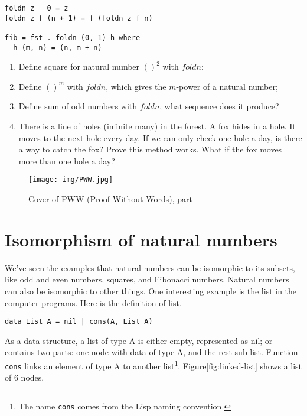 \documentclass[UTF8]{article}
\begin{document}
\lstset{frame=single}
\begin{lstlisting}
foldn z _ 0 = z
foldn z f (n + 1) = f (foldn z f n)

fib = fst . foldn (0, 1) h where
  h (m, n) = (n, m + n)
\end{lstlisting}

\begin{Exercise}
\begin{enumerate}
\item Define square for natural number $()^2$ with $foldn$;
\item Define $()^m$ with $foldn$, which gives the $m$-power of a natural number;
\item Define sum of odd numbers with $foldn$, what sequence does it produce?
\item There is a line of holes (infinite many) in the forest. A fox hides in a hole. It moves to the next hole every day. If we can only check one hole a day, is there a way to catch the fox? Prove this method works. What if the fox moves more than one hole a day\cite{Gusen2014}?
\end{enumerate}
\end{Exercise}

\begin{figure}[htbp]
 \centering
 \texttt{[image: img/PWW.jpg]}
 \caption{Cover of PWW (Proof Without Words), part}
 \label{fig:PWW}
\end{figure}

\section{Isomorphism of natural numbers}

We've seen the examples that natural numbers can be isomorphic to its subsets, like odd and even numbers, squares, and Fibonacci numbers. Natural numbers can also be isomorphic to other things. One interesting example is the list in the computer programs. Here is the definition of list.

\lstset{frame=none}
\begin{lstlisting}
data List A = nil | cons(A, List A)
\end{lstlisting}

As a data structure, a list of type A is either empty, represented as nil; or contains two parts: one node with data of type A, and the rest sub-list. Function \texttt{cons} links an element of type A to another list\footnote{The name \texttt{cons} comes from the Lisp naming convention.}. Figure\ref{fig:linked-list} shows a list of 6 nodes.
\end{document}
